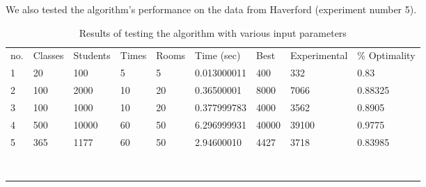 \documentclass[11pt, oneside]{article}   	%
\begin{document}
We also tested the algorithm's performance on the data from Haverford (experiment number 5).

\newpage
\begin{table}[]
\centering
\begin{tabular}{lllllllll}
no. & Classes & Students & Times & Rooms & Time (sec) & Best  & Experimental & \% Optimality \\
1             & 20         & 100         & 5        & 5        & 0.013000011    & 400   & 332          & 0.83          \\
2             & 100        & 2000        & 10       & 20       & 0.36500001     & 8000  & 7066         & 0.88325       \\
3             & 100        & 1000        & 10       & 20       & 0.377999783    & 4000  & 3562         & 0.8905        \\
4             & 500        & 10000       & 60       & 50       & 6.296999931    & 40000 & 39100        & 0.9775        \\
5            & 365            & 1177            & 60       & 50      & 2.94600010         & 4427      & 3718             & 0.83985    \\
              &            &             &          &          &                &       &              &               \\
              &            &             &          &          &                &       &              &               \\
              &            &             &          &          &                &       &              &               \\
              &            &             &          &          &                &       &              &               \\
              &            &             &          &          &                &       &              &               \\
              &            &             &          &          &                &       &              &               \\
              &            &             &          &          &                &       &              &               \\
              &            &             &          &          &                &       &              &              
\end{tabular}
\caption{Results of testing the algorithm with various input parameters}
\label{my-label}
\end{table}
\end{document}
